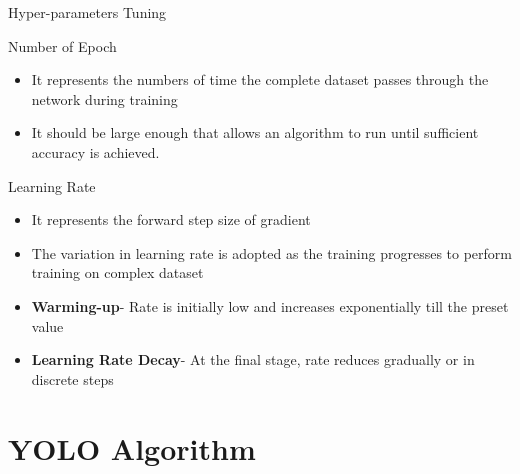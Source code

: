 \documentclass[10pt]{beamer}
\begin{document}
\begin{frame}{Hyper-parameters Tuning}
    \begin{block}{Number of Epoch}
        \begin{itemize}
            \item It represents the numbers of time the complete dataset passes through the network during training
            \item It should be large enough that allows an algorithm to run until sufficient accuracy is achieved.
        \end{itemize}
    \end{block}
    
        \begin{block}{Learning Rate}
         \begin{itemize}
             \item It represents the forward step size of gradient 
             \item The variation in learning rate is adopted as the training progresses to perform training on complex dataset
             \item \textbf{Warming-up}- Rate is initially low and increases exponentially till the preset value 
             \item \textbf{Learning Rate Decay}- At the final stage, rate reduces gradually or in discrete steps  
         \end{itemize}
    \end{block}   
\end{frame}



\section{YOLO Algorithm}
\end{document}
